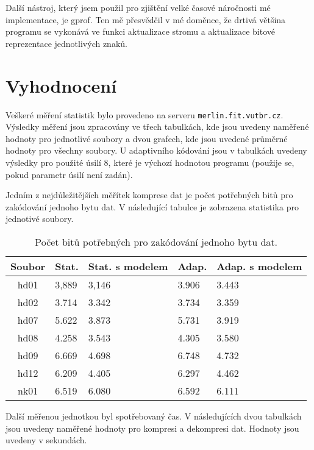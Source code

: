 \documentclass[11pt,a4paper,titlepage]{article}
\begin{document}
            Další nástroj, který jsem použil pro zjištění velké časové náročnosti mé implementace, je gprof. Ten mě přesvědčil v mé doměnce,
            že drtivá většina programu se vykonává ve funkci aktualizace stromu a aktualizace bitové reprezentace jednotlivých znaků.

    \section{Vyhodnocení}
        Veškeré měření statistik bylo provedeno na serveru \texttt{merlin.fit.vutbr.cz}. Výsledky měření jsou zpracovány
        ve třech tabulkách, kde jsou uvedeny naměřené hodnoty pro jednotlivé soubory a dvou grafech, kde jsou uvedené
        průměrné hodnoty pro všechny soubory. U adaptivního kódování jsou v tabulkách uvedeny výsledky pro použité
        úsilí 8, které je výchozí hodnotou programu (použije se, pokud parametr úsilí není zadán).

        Jedním z nejdůležitějších měřítek komprese dat je počet potřebných bitů pro zakódování jednoho bytu dat.
        V následující tabulce je zobrazena statistika pro jednotivé soubory.
        \begin{table}[htbp]
            \centering
            \begin{tabular}{|c|l|l|l|l|}
                \hline Soubor & Stat. & Stat. s modelem & Adap. & Adap. s modelem \\ \hline
                hd01 & 3,889 & 3,146 & 3.906 & 3.443 \\
                hd02 & 3.714 & 3.342 & 3.734 & 3.359 \\
                hd07 & 5.622 & 3.873 & 5.731 & 3.919 \\
                hd08 & 4.258 & 3.543 & 4.305 & 3.580 \\
                hd09 & 6.669 & 4.698 & 6.748 & 4.732 \\
                hd12 & 6.209 & 4.405 & 6.297 & 4.462 \\
                nk01 & 6.519 & 6.080 & 6.592 & 6.111 \\ \hline
            \end{tabular}
            \caption{Počet bitů potřebných pro zakódování jednoho bytu dat.}
        \end{table}

        Další měřenou jednotkou byl spotřebovaný čas. V následujících dvou tabulkách jsou uvedeny naměřené hodnoty
        pro kompresi a dekompresi dat. Hodnoty jsou uvedeny v sekundách.
\end{document}
